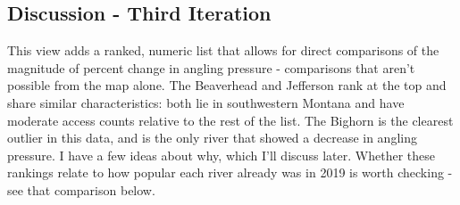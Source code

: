 \documentclass[11pt]{article}
\begin{document}
    \hypertarget{discussion---third-iteration}{%
\subsection{Discussion - Third
Iteration}\label{discussion---third-iteration}}

This view adds a ranked, numeric list that allows for direct comparisons
of the magnitude of percent change in angling pressure - comparisons
that aren't possible from the map alone. The Beaverhead and Jefferson
rank at the top and share similar characteristics: both lie in
southwestern Montana and have moderate access counts relative to the
rest of the list. The Bighorn is the clearest outlier in this data, and
is the only river that showed a decrease in angling pressure. I have a
few ideas about why, which I'll discuss later. Whether these rankings
relate to how popular each river already was in 2019 is worth checking -
see that comparison below.
\end{document}
